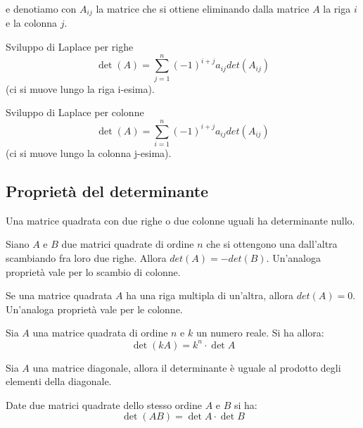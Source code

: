 e denotiamo con $A_{ij}$ la matrice che si ottiene eliminando dalla matrice $A$ la riga $i$ e la colonna $j$.

\begin{definition}{Sviluppo di Laplace per righe}
    $$\det(A)=\sum_{j=1}^n{(-1)^{i+j}a_{ij}det(A_{ij})}$$
    (ci si muove lungo la riga i-esima).
\end{definition}

\begin{definition}{Sviluppo di Laplace per colonne}
    $$\det(A)=\sum_{i=1}^n{(-1)^{i+j}a_{ij}det(A_{ij})}$$
    (ci si muove lungo la colonna j-esima).
\end{definition}

\subsection{Proprietà del determinante}

\begin{property}
    Una matrice quadrata con due righe o due colonne uguali ha determinante nullo.
\end{property}

\begin{property}
    Siano $A$ e $B$ due matrici quadrate di ordine $n$ che si ottengono una dall'altra scambiando fra loro due righe. Allora $det(A) = -det(B)$. Un'analoga proprietà vale per lo scambio di colonne.
\end{property}

\begin{property}
    Se una matrice quadrata $A$ ha una riga multipla di un'altra, allora $det(A)=0$. Un'analoga proprietà vale per le colonne.
\end{property}

\begin{property}
    Sia $A$ una matrice quadrata di ordine $n$ e $k$ un numero reale. Si ha allora: $$\det (kA) = k^n \cdot \det A$$
\end{property}

\begin{property}
    Sia $A$ una matrice diagonale, allora il determinante è uguale al prodotto degli elementi della diagonale.
\end{property}

\begin{theorem}[di Binet]
    Date due matrici quadrate dello stesso ordine $A$ e $B$ si ha: $$ \det(AB) = \det A \cdot \det B$$
\end{theorem}

